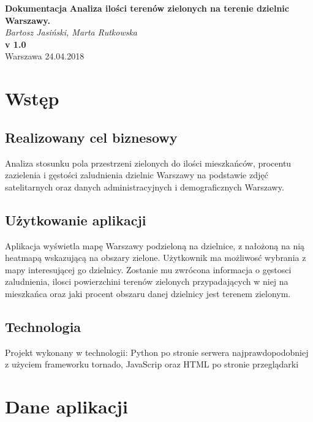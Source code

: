 \documentclass[a4paper,12p]{article}
\begin{document}
\begin{titlepage}
   \begin{center}
 	\Huge\textbf{Dokumentacja} 
	\bigbreak
      \Large\textbf{Analiza ilości terenów zielonych na terenie dzielnic Warszawy.}\\
      \large\textit{Bartosz Jasiński, Marta Rutkowska} \\	
	\bigbreak
	\bigbreak
	\Large\textbf{v 1.0} \\
	\small{Warszawa 24.04.2018}
	
   \end{center}
\end{titlepage}

	\tableofcontents

	\section{Wstęp}
	\subsection{Realizowany cel biznesowy}
		Analiza stosunku pola przestrzeni zielonych do ilości mieszkańców, procentu zazielenia i gęstości zaludnienia dzielnic Warszawy na podstawie zdjęć satelitarnych oraz danych administracyjnych i demograficznych Warszawy. 
	\subsection{Użytkowanie aplikacji}
		Aplikacja wyświetla mapę Warszawy podzieloną na dzielnice, z nałożoną na nią heatmapą wskazującą na obszary zielone. Użytkownik ma możliwosć wybrania z mapy interesującej go dzielnicy. Zostanie mu zwrócona informacja o gęstosci zaludnienia, ilosci powierzchini terenów zielonych przypadających w niej na mieszkańca oraz jaki procent obszaru danej dzielnicy jest terenem zielonym.
	\subsection{Technologia}
		Projekt wykonany w technologii: Python po stronie serwera najprawdopodobniej z użyciem frameworku tornado, JavaScrip oraz HTML po stronie przeglądarki

	
	\section{Dane aplikacji}
\end{document}

